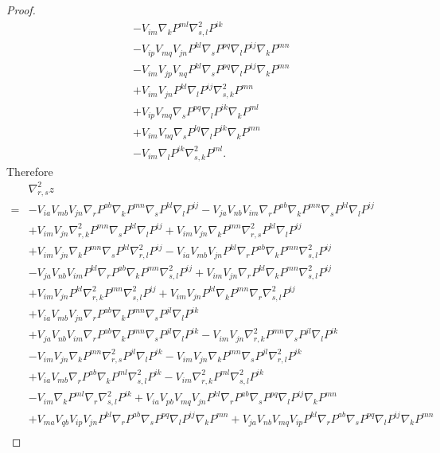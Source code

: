 \documentclass{amsart}
\theoremstyle{definition}
\theoremstyle{remark}
\numberwithin{equation}{section}
\begin{document}
\begin{proof}
\begin{align*}
&-V_{im}\nabla_kP^{ml}\nabla^2_{s,l}P^{ik}\\
&-V_{ip}V_{mq}V_{jn}P^{kl}\nabla_sP^{pq}\nabla_l P^{ij}\nabla_kP^{mn}\\
&-V_{im}V_{jp}V_{nq}P^{kl}\nabla_sP^{pq}\nabla_l P^{ij}\nabla_kP^{mn}\\
&+V_{im}V_{jn}P^{kl}\nabla_l P^{ij}\nabla^2_{s,k}P^{mn}\\
&+V_{ip}V_{mq}\nabla_sP^{pq}\nabla_lP^{ik}\nabla_kP^{ml}\\
&+V_{im}V_{nq}\nabla_sP^{lq}\nabla_lP^{ik}\nabla_kP^{mn}\\
&-V_{im}\nabla_lP^{ik}\nabla^2_{s,k}P^{ml}.
\end{align*}
Therefore
\begin{align*}
&\nabla^2_{r,s} z\\
=&-V_{ia}V_{mb}V_{jn}\nabla_r P^{ab}\nabla_kP^{mn}\nabla_s P^{kl}\nabla_l P^{ij}-V_{ja}V_{nb}V_{im}\nabla_r P^{ab}\nabla_kP^{mn}\nabla_s P^{kl}\nabla_l P^{ij}\\
&+V_{im}V_{jn}\nabla^2_{r,k}P^{mn}\nabla_s P^{kl}\nabla_l P^{ij}+V_{im}V_{jn}\nabla_kP^{mn}\nabla^2_{r,s} P^{kl}\nabla_l P^{ij}\\
&+V_{im}V_{jn}\nabla_kP^{mn}\nabla_s P^{kl}\nabla^2_{r,l} P^{ij}-V_{ia}V_{mb}V_{jn}P^{kl}\nabla_rP^{ab}\nabla_kP^{mn}\nabla^2_{s,l} P^{ij}\\
&-V_{ja}V_{nb}V_{im}P^{kl}\nabla_rP^{ab}\nabla_kP^{mn}\nabla^2_{s,l} P^{ij}+V_{im}V_{jn}\nabla_rP^{kl}\nabla_kP^{mn}\nabla^2_{s,l} P^{ij}\\
&+V_{im}V_{jn}P^{kl}\nabla^2_{r,k}P^{mn}\nabla^2_{s,l} P^{ij}+V_{im}V_{jn}P^{kl}\nabla_kP^{mn}\nabla_r\nabla^2_{s,l} P^{ij}\\
&+V_{ia}V_{mb}V_{jn}\nabla_rP^{ab}\nabla_kP^{mn}\nabla_sP^{jl}\nabla_lP^{ik}\\
&+V_{ja}V_{nb}V_{im}\nabla_rP^{ab}\nabla_kP^{mn}\nabla_sP^{jl}\nabla_lP^{ik}-V_{im}V_{jn}\nabla^2_{r,k}P^{mn}\nabla_sP^{jl}\nabla_lP^{ik}\\
&-V_{im}V_{jn}\nabla_kP^{mn}\nabla^2_{r,s}P^{jl}\nabla_lP^{ik}-V_{im}V_{jn}\nabla_kP^{mn}\nabla_sP^{jl}\nabla^2_{r,l}P^{ik}\\
&+V_{ia}V_{mb}\nabla_rP^{ab}\nabla_kP^{ml}\nabla^2_{s,l}P^{ik}-V_{im}\nabla^2_{r,k}P^{ml}\nabla^2_{s,l}P^{ik}\\
&-V_{im}\nabla_kP^{ml}\nabla_r\nabla^2_{s,l}P^{ik}+V_{ia}V_{pb}V_{mq}V_{jn}P^{kl}\nabla_rP^{ab}\nabla_sP^{pq}\nabla_l P^{ij}\nabla_kP^{mn}\\
&+V_{ma}V_{qb}V_{ip}V_{jn}P^{kl}\nabla_rP^{ab}\nabla_sP^{pq}\nabla_l P^{ij}\nabla_kP^{mn}+V_{ja}V_{nb}V_{mq}V_{ip}P^{kl}\nabla_rP^{ab}\nabla_sP^{pq}\nabla_l P^{ij}\nabla_kP^{mn}\\

\end{align*}
\end{proof}
\end{document}
